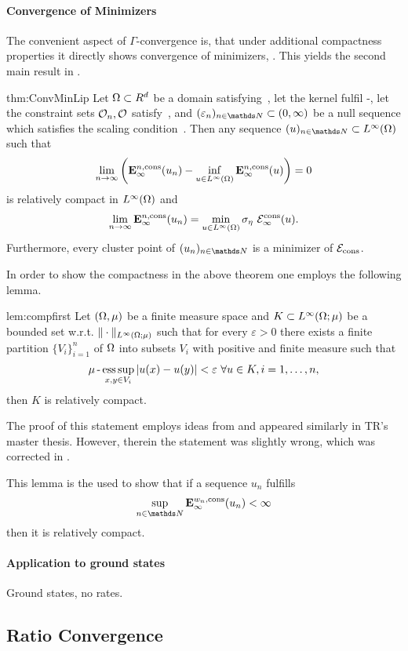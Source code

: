 \paragraph{Convergence of Minimizers}
%
The convenient aspect of $\Gamma$-convergence is, that under additional compactness properties it directly shows convergence of minimizers, \cite[Thm. 8]{Brad02}. This yields the second main result in \cite{roith2022continuum}.
%
%
\begin{theorem}{\cite[Thm. 2]{roith2022continuum}}{thm:ConvMinLip}
Let $\Omega\subset R^d$ be a domain satisfying~, 
let the kernel fulfil -, 
let the constraint sets $\mathcal{O}_n,\mathcal{O}$ satisfy~, 
and $(\gscale_n)_{n\in\N}\subset(0,\infty)$ be a null sequence which satisfies the scaling 
condition~.
Then any sequence $(u)_{n\in\N}\subset L^{\infty}(\Omega)$ such that 
\begin{align*}
\lim_{n\rightarrow\infty}\left(\mathbf{E}^{n,\mathrm{cons}}_\infty(u_n) - 
\inf_{u\in L^{\infty}(\Omega)}\mathbf{E}^{n,\mathrm{cons}}_\infty(u)\right) = 0
\end{align*}
is relatively compact in $L^{\infty}(\Omega)$ and 
\begin{align*}
\lim_{n\rightarrow\infty} \mathbf{E}^{n,\mathrm{cons}}_\infty(u_n) = 
\min_{u\in L^{\infty}(\Omega)}\sigma_{\eta}~\mathcal{E}^{\mathrm{cons}}_\infty(u).
\end{align*}
Furthermore, every cluster point of $(u_n)_{n\in\N}$ is a minimizer of 
$\mathcal{E}_{\mathrm{cons}}$. 
\end{theorem}
%
%
In order to show the compactness in the above theorem one employs the following lemma.
%
%
\begin{lemma}{\cite[Lem. 4]{roith2022continuum}}{lem:compfirst}
Let $(\Omega,\mu)$ be a finite measure space and $K\subset L^{\infty}(\Omega;\mu)$ be a bounded set w.r.t. $\|\cdot\|_{L^{\infty}(\Omega;\mu)}$ such that 
for every $\varepsilon>0$ there exists a finite partition $\{V_i\}_{i=1}^n$ of $\Omega$ into subsets $V_i$ with positive and finite measure such that
\begin{align}\label{eq:partinf}
\mu\operatorname{-}\operatorname*{ess\,sup}_{x,y\in V_i} \left|u(x) - u(y)\right| < \varepsilon\ \forall u\in K, i=1,\ldots,n,
\end{align}
then $K$ is relatively compact. 
\end{lemma}
%
\begin{remark}{}{}
The proof of this statement employs ideas from \cite[Lem. IV.5.4]{dunford1988linear} and appeared similarly in TR's master thesis. However, therein the statement was slightly wrong, which was corrected in \cite{roith2022continuum}.
\end{remark}
%
This lemma is the used to show that if a sequence $u_n$ fulfills
\begin{align*}
\sup_{n\in\N}\GE^{w_n,\text{cons}}_\infty(u_n)<\infty
\end{align*}
%
then it is relatively compact.
%
\paragraph{Application to ground states}
%
Ground states, no rates.

%
%
%
\subsection{Ratio Convergence}\label{sec:RatConv}
%

